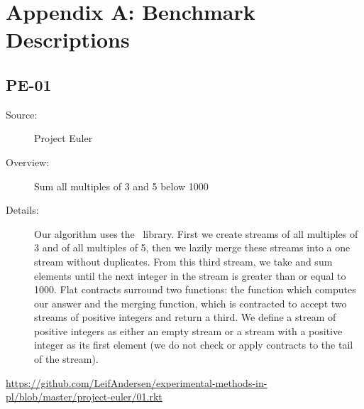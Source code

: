 \newpage
\appendix
\section*{Appendix A: Benchmark Descriptions}
\subsection*{PE-01~\hrulefill}
\begin{description}
\item[Source:] Project Euler
\item[Overview:] Sum all multiples of 3 and 5 below 1000
\item[Details:] 
  Our algorithm uses the ~library.
  First we create streams of all multiples of 3 and of all multiples of 5, then we lazily merge these streams into a one stream without duplicates.
  From this third stream, we take and sum elements until the next integer in the stream is greater than or equal to 1000.
  Flat contracts surround two functions: the  function which computes our answer and the merging function, which is contracted to accept two streams of positive integers and return a third.
  We define a stream of positive integers as either an empty stream or a stream with a positive integer as its first element (we do not check or apply contracts to the tail of the stream).
\end{description}
\url{https://github.com/LeifAndersen/experimental-methods-in-pl/blob/master/project-euler/01.rkt}

